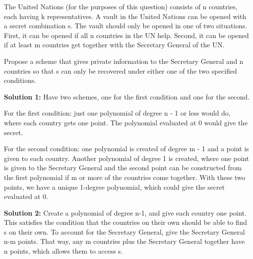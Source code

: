 \question The United Nations (for the purposes of this question) consists of n countries, each having k representatives.
A vault in the United Nations can be opened with a secret combination s. The vault should
only be opened in one of two situations. First, it can be opened if all n countries in the UN help.
Second, it can be opened if at least m countries get together with the Secretary General of the UN.

Propose a scheme that gives private information to the Secretary General and n countries so that s can
only be recovered under either one of the two specified conditions.

 
\begin{solution}
\textbf{Solution 1: }
Have two schemes, one for the first condition and one for the second.

For the first condition: just one polynomial of degree n - 1 or less would do, where each country gets one point. The polynomial evaluated at 0 would give the secret.

For the second condition: one polynomial is created of degree m - 1 and a point is given to each
country. Another polynomial of degree 1 is created, where one point is given to the Secretary General
and the second point can be constructed from the first polynomial if m or more of the countries come
together. With these two points, we have a unique 1-degree polynomial, which could give the secret
evaluated at 0.

\textbf{Solution 2: }
Create a polynomial of degree n-1, and give each country one point. This satisfies the condition that the countries on their own should be able to find s on their own. To account for the Secretary General, give the Secretary General n-m points. That way, any m countries plus the Secretary General together have n points, which allows them to access s.
\end{solution}
\newpage